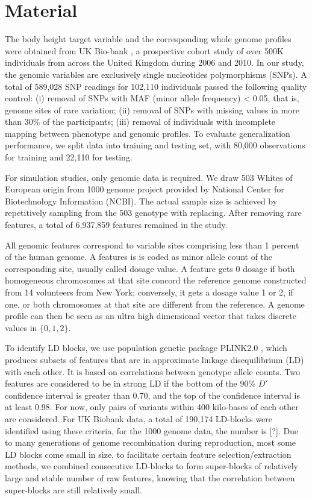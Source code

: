 \documentclass[acmtog, authorversion]{acmart}
\begin{document}
\section{Material}
The body height target variable and the corresponding whole genome profiles were obtained from UK Bio-bank \cite{Data:UK_Biobank}, a prospective cohort study of over 500K individuals from across the United Kingdom during 2006 and 2010. In our study, the genomic variables are exclusively single nucleotides polymorphisms (SNPs). A total of 589,028 SNP readings for 102,110 individuals passed the following quality control: (i) removal of SNPs with MAF (minor allele frequency) < 0.05, that is, genome sites of rare variation; (ii) removal of SNPs with missing values in more than 30\% of the participants; (iii) removal of individuals with incomplete mapping between phenotype and genomic profiles. To evaluate generalization performance, we split data into training and testing set, with 80,000 observations for training and 22,110 for testing. 

For simulation studies, only genomic data is required. We draw 503 Whites of European origin from 1000 genome project \cite{Data:1K_Genome} provided by National Center for Biotechnology Information (NCBI). The actual sample size is achieved by repetitively sampling from the 503 genotype with replacing. After removing rare features, a total of 6,937,859 features remained in the study.

All genomic features correspond to variable sites comprising less than 1 percent of the human genome. A features is is coded as minor allele count of the corresponding site, usually called dosage value. A feature gets 0 dosage if both homogeneous chromosomes at that site concord the reference genome constructed from 14 volunteers from New York; conversely, it gets a dosage value 1 or 2, if one, or both chromosomes at that site are different from the reference. A genome profile can then be seen as an ultra high dimensional vector that takes discrete values in $\{0, 1, 2\}$.

To identify LD blocks, we use population genetic package PLINK2.0 \cite{PK:Plink2}, which produces subsets of features that are in approximate linkage disequilibrium (LD) with each other. It is based on correlations between genotype allele counts. Two features are considered to be in strong LD if the bottom of the 90\% $D\prime$ confidence interval is greater than 0.70, and the top of the confidence interval is at least 0.98. For now, only pairs of variants within 400 kilo-bases of each other are considered. For UK Biobank data, a total of 190,174 LD-blocks were identified using these criteria, for the 1000 genome data, the number is [?]. Due to many generations of genome recombination during reproduction, most some LD blocks come small in size, to facilitate certain feature selection/extraction methods, we combined consecutive LD-blocks to form super-blocks of relatively large and stable number of raw features, knowing that the correlation between super-blocks are still relatively small.
\end{document}
